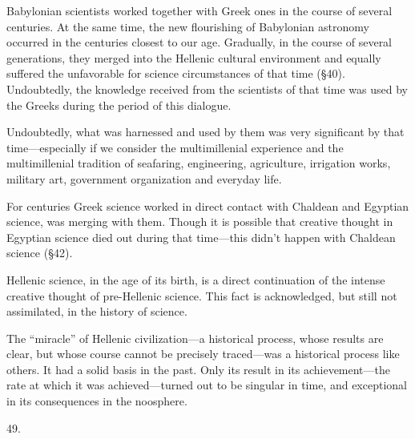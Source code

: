 Babylonian scientists worked together with Greek ones in the course of several
centuries.  At the same time, the new flourishing of Babylonian astronomy
occurred in the centuries closest to our age.  Gradually, in the course of
several generations, they merged into the Hellenic cultural environment and
equally suffered the unfavorable for science circumstances of that time (§40).
Undoubtedly, the knowledge received from the scientists of that time was used
by the Greeks during the period of this dialogue.

Undoubtedly, what was harnessed and used by them was very significant by that
time---especially if we consider the multimillenial experience and the
multimillenial tradition of seafaring, engineering, agriculture, irrigation
works, military art, government organization and everyday life.

For centuries Greek science worked in direct contact with Chaldean and Egyptian
science, was merging with them.  Though it is possible that creative thought in
Egyptian science died out during that time---this didn't happen with Chaldean
science (§42).

Hellenic science, in the age of its birth, is a direct continuation of the
intense creative thought of pre-Hellenic science.  This fact is acknowledged,
but still not assimilated, in the history of science.

The ``miracle'' of Hellenic civilization---a historical process, whose results
are clear, but whose course cannot be precisely traced---was a historical
process like others.  It had a solid basis in the past.  Only its result in its
achievement---the rate at which it was achieved---turned out to be singular in
time, and exceptional in its consequences in the noosphere.


49. 
